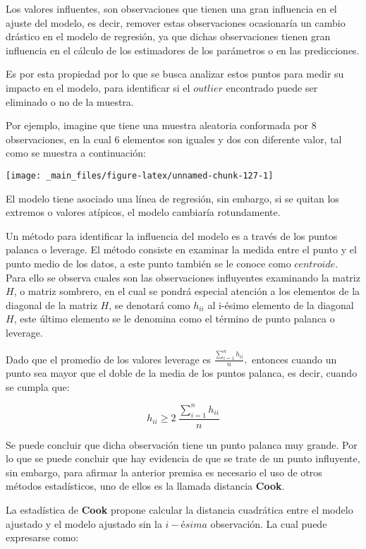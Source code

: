 \documentclass[
  a4paper,
  oneside,
  openany]{book}
\begin{document}
Los valores influentes, son observaciones que tienen una gran influencia en el ajuste del modelo, es decir, remover estas observaciones ocasionaría un cambio drástico en el modelo de regresión, ya que dichas observaciones tienen gran influencia en el cálculo de los estimadores de los parámetros o en las predicciones.

Es por esta propiedad por lo que se busca analizar estos puntos para medir su impacto en el modelo, para identificar si el \(outlier\) encontrado puede ser eliminado o no de la muestra.

Por ejemplo, imagine que tiene una muestra aleatoria conformada por 8 observaciones, en la cual 6 elementos son iguales y dos con diferente valor, tal como se muestra a continuación:

\begin{center}\texttt{[image: \_main\_files/figure-latex/unnamed-chunk-127-1]} \end{center}

El modelo tiene asociado una línea de regresión, sin embargo, si se quitan los extremos o valores atípicos, el modelo cambiaría rotundamente.

Un método para identificar la influencia del modelo es a través de los puntos palanca o leverage. El método consiste en examinar la medida entre el punto y el punto medio de los datos, a este punto también se le conoce como \(centroide\). Para ello se observa cuales son las observaciones influyentes examinando la matriz \(H\), o matriz sombrero, en el cual se pondrá especial atención a los elementos de la diagonal de la matriz \(H\), se denotará como \(h_{ii}\) al i-ésimo elemento de la diagonal \(H\), este último elemento se le denomina como el término de punto palanca o leverage.

Dado que el promedio de los valores leverage es \(\frac{\sum_{i=1}^{n}h_{ii}}{n},\) entonces cuando un punto sea mayor que el doble de la media de los puntos palanca, es decir, cuando se cumpla que:

\[h_{ii} \geq  2 \ \frac{\sum_{i=1}^{n}h_{ii}}{n}\]

Se puede concluir que dicha observación tiene un punto palanca muy grande. Por lo que se puede concluir que hay evidencia de que se trate de un punto influyente, sin embargo, para afirmar la anterior premisa es necesario el uso de otros métodos estadísticos, uno de ellos es la llamada distancia \textbf{Cook}.

La estadística de \textbf{Cook} propone calcular la distancia cuadrática entre el modelo ajustado y el modelo ajustado sin la \(i-ésima\) observación. La cual puede expresarse como:
\end{document}
